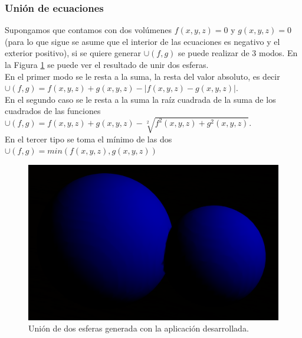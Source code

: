 \documentclass[12pt]{article}
\begin{document}
\subsubsection{Unión de ecuaciones}
Supongamos que contamos con dos volúmenes $f(x,y,z)=0$ y $g(x,y,z)=0$ (para lo que sigue se asume que el interior de las ecuaciones es negativo y el exterior positivo), si se quiere generar  $\cup(f,g)$ se puede realizar de 3 modos. En la Figura \ref{union} se puede ver el resultado de unir dos esferas.
\\En el primer modo se le resta a la suma, la resta del valor absoluto, es decir $\cup(f,g) =  f(x,y,z) + g(x,y,z) - |f(x,y,z) - g(x,y,z)|$. 
\\En el segundo caso se le resta a la suma la raíz cuadrada de la suma de los cuadrados de las funciones  $\cup(f,g) = f(x,y,z) + g(x,y,z) -\sqrt[2]{f^2(x,y,z) + g^2(x,y,z)}$.
\\En el tercer tipo se toma el mínimo de las dos  $\cup(f,g)=min(f(x,y,z),g(x,y,z))$
\begin{figure}[h]
\includegraphics[width=0.7\linewidth,center]{oi1.png}
\caption{Unión de dos esferas generada con la aplicación desarrollada.}
\label{union}
\end{figure}
\end{document}
